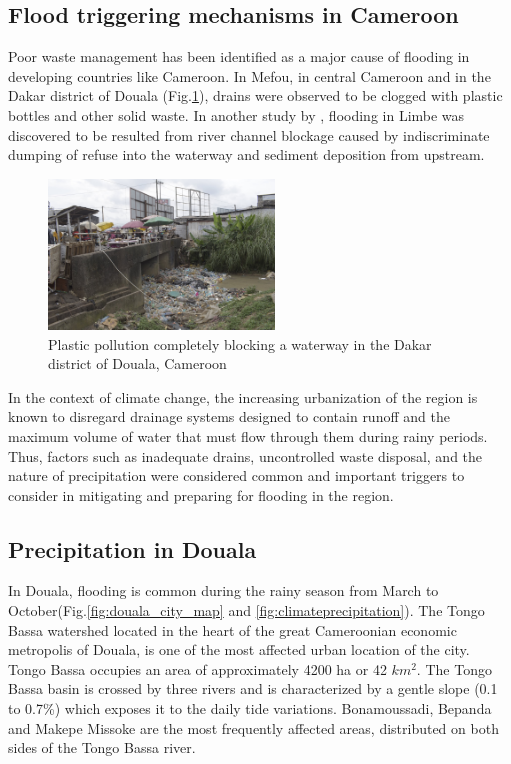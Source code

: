 \subsection{Flood triggering mechanisms in Cameroon}

Poor waste management has been identified as a major cause of flooding in developing countries like Cameroon\cite{barthelemy2016legislative}. In Mefou, in central Cameroon and in the Dakar district of Douala (Fig.\ref{fig:dechet}), drains were observed to be clogged with plastic bottles and other solid waste\cite{gideonrole}. In another study by \cite{wung2019enhancing}, flooding in Limbe was discovered to be resulted from river channel blockage caused by indiscriminate dumping of refuse into the waterway and sediment deposition from upstream.

\begin{figure}[hbt!]
	\centering
	\includegraphics[height=4cm,keepaspectratio,width=0.8\linewidth]{figure/dechet.JPG}
	\caption{Plastic pollution completely blocking a waterway in the Dakar district of Douala, Cameroon\cite{greenpeaceorg}
}
	\label{fig:dechet}
\end{figure}

In the context of climate change, the increasing urbanization of the region is known to disregard drainage systems designed to contain runoff and the maximum volume of water that must flow through them during rainy periods. Thus, factors such as inadequate drains, uncontrolled waste disposal, and the nature of precipitation were considered common and important triggers to consider in mitigating and preparing for flooding in the region\cite{ngalim2020stakeholders}. 

\subsection{Precipitation in Douala}
In Douala, flooding is common during the rainy season from March to October(Fig.\ref{fig:douala_city_map} and \ref{fig:climateprecipitation}). The Tongo Bassa watershed located in the heart of the great Cameroonian economic metropolis of Douala, is one of the most affected urban location of the city. Tongo Bassa occupies an area of approximately 4200 ha or 42 $km^2$. The Tongo Bassa basin is crossed by three rivers and is characterized by a gentle slope (0.1 to 0.7\%) which exposes it to the daily tide variations. Bonamoussadi, Bepanda and Makepe Missoke are the most frequently affected areas, distributed on both sides of the Tongo Bassa river. 

